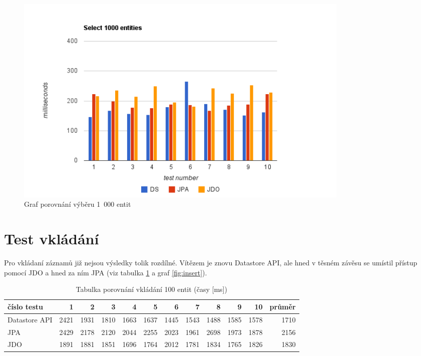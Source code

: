 \begin{figure}[h]
\begin{center}
\includegraphics[width=6.5in]{figures/select.png}
\caption{Graf porovnání výběru 1~000 entit}
\label{fig:select}
\end{center}
\end{figure}

\section{Test vkládání}
Pro vkládaní záznamů již nejsou výsledky tolik rozdílné. Vítězem je znovu Datastore API, ale hned v těsném závěsu se umístil přístup pomocí JDO a hned za ním JPA (viz tabulka \ref{tab:insert} a graf \ref{fig:insert}). 

\begin{table}[h]
\centering
\caption{Tabulka porovnání vkládání 100 entit (časy [ms])}\label{tab:insert}
\begin{tabular}{|l|r|r|r|r|r|r|r|r|r|r|r|}
   \hline
číslo testu	& 1		& 2		& 3		& 4		& 5		& 6		& 7		& 8		& 9		& 10		& průměr \\
   \hline
Datastore API	& 2421	& 1931	& 1810	& 1663	& 1637	& 1445	& 1543	& 1488	& 1585	& 1578	& 1710 \\
JPA	& 2429	& 2178	& 2120	& 2044	& 2255	& 2023	& 1961	& 2698	& 1973	& 1878	& 2156 \\
JDO	& 1891	& 1881	& 1851	& 1696	& 1764	& 2012	& 1781	& 1834	& 1765	& 1826	& 1830 \\
   \hline
\end{tabular}
\end{table}

